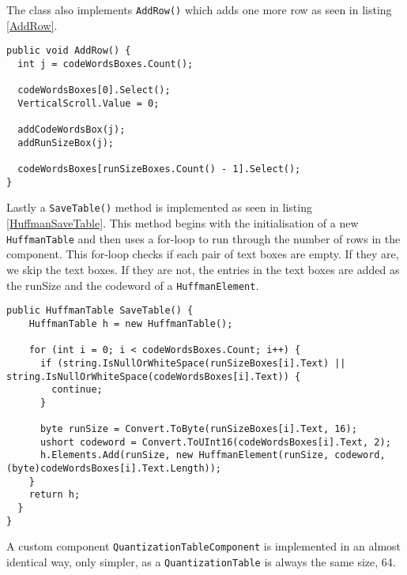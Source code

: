 The class also implements \lstinline|AddRow()| which adds one more row as seen in listing \ref{AddRow}.

\begin{lstlisting}[firstnumber=80,label=AddRow, caption={\lstinline|AddRow()| method \textbf{File: }HuffmanTableComponent.cs}]
public void AddRow() {
  int j = codeWordsBoxes.Count();
  
  codeWordsBoxes[0].Select();
  VerticalScroll.Value = 0;
  
  addCodeWordsBox(j);
  addRunSizeBox(j);

  codeWordsBoxes[runSizeBoxes.Count() - 1].Select();
}
\end{lstlisting}

Lastly a \lstinline|SaveTable()| method is implemented as seen in listing \ref{HuffmanSaveTable}.
This method begins with the initialisation of a new \lstinline|HuffmanTable| and then uses a for-loop to run through the number of rows in the component.
This for-loop checks if each pair of text boxes are empty.
If they are, we skip the text boxes.
If they are not, the entries in the text boxes are added as the runSize and the codeword of a  \lstinline|HuffmanElement|. 

\begin{lstlisting}[firstnumber=137,label=HuffmanSaveTable, caption={Save method of the \lstinline|HuffmanTable| method \textbf{File: }HuffmanTableComponent.cs}]
public HuffmanTable SaveTable() {
    HuffmanTable h = new HuffmanTable();
    
    for (int i = 0; i < codeWordsBoxes.Count; i++) {
      if (string.IsNullOrWhiteSpace(runSizeBoxes[i].Text) || string.IsNullOrWhiteSpace(codeWordsBoxes[i].Text)) {
        continue;
      }
      
      byte runSize = Convert.ToByte(runSizeBoxes[i].Text, 16);
      ushort codeword = Convert.ToUInt16(codeWordsBoxes[i].Text, 2);
      h.Elements.Add(runSize, new HuffmanElement(runSize, codeword, (byte)codeWordsBoxes[i].Text.Length));
    }
    return h;
  }
}
\end{lstlisting}

A custom component \lstinline|QuantizationTableComponent| is implemented in an almost identical way, only simpler, as a \lstinline|QuantizationTable| is always the same size, 64.